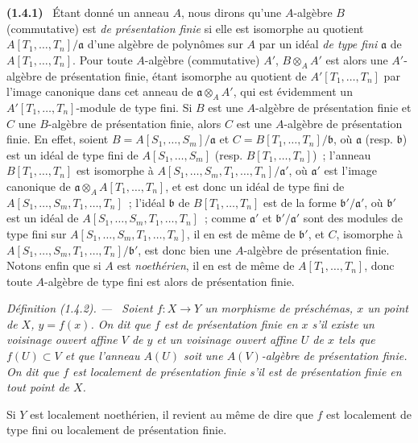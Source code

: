 \documentclass[10pt,oneside]{book}
\makeatletter
\newcommand{\setmanualcurrentlabel}[1]{\def\@currentlabel{#1}}
\newenvironment{env}[1][]{\setmanualcurrentlabel{#1}\par\medskip\noindent\textbf{(#1)}\ }{\par}
\newenvironment{definition}[1][]{%
  \setmanualcurrentlabel{#1}\par\medskip\noindent\itshape Définition (#1). ---\ }{\par}
\makeatother
\begin{document}
\begin{env}[1.4.1]
\label{IV.1.4.1-fr}
Étant donné un anneau $A$, nous dirons qu'une $A$-algèbre $B$ (commutative)
est \emph{de présentation finie} si elle est isomorphe au quotient
$A[T_1,\ldots,T_n]/\mathfrak a$ d'une algèbre de polynômes sur $A$ par un
idéal \emph{de type fini} $\mathfrak a$ de $A[T_1,\ldots,T_n]$. Pour toute
$A$-algèbre (commutative) $A'$, $B\otimes_AA'$ est alors une $A'$-algèbre de
présentation finie, étant isomorphe au quotient de $A'[T_1,\ldots,T_n]$ par
l'image canonique dans cet anneau de $\mathfrak a\otimes_AA'$, qui est
évidemment un $A'[T_1,\ldots,T_n]$-module de type fini. Si $B$ est une
$A$-algèbre de présentation finie et $C$ une $B$-algèbre de présentation
finie, alors $C$ est une $A$-algèbre de présentation finie. En effet, soient
$B=A[S_1,\ldots,S_m]/\mathfrak a$ et
$C=B[T_1,\ldots,T_n]/\mathfrak b$, où $\mathfrak a$ (resp. $\mathfrak b$) est
un idéal de type fini de $A[S_1,\ldots,S_m]$ (resp.
$B[T_1,\ldots,T_n]$)~; l'anneau $B[T_1,\ldots,T_n]$ est isomorphe à
$A[S_1,\ldots,S_m,T_1,\ldots,T_n]/\mathfrak a'$, où $\mathfrak a'$ est
l'image canonique de
$\mathfrak a\otimes_AA[T_1,\ldots,T_n]$, et est donc un idéal de type fini de
$A[S_1,\ldots,S_m,T_1,\ldots,T_n]$~; l'idéal $\mathfrak b$ de
$B[T_1,\ldots,T_n]$ est de la forme $\mathfrak b'/\mathfrak a'$, où
$\mathfrak b'$ est un idéal de $A[S_1,\ldots,S_m,T_1,\ldots,T_n]$~; comme
$\mathfrak a'$ et $\mathfrak b'/\mathfrak a'$ sont des modules de type fini
sur $A[S_1,\ldots,S_m,T_1,\ldots,T_n]$, il en est de même de $\mathfrak b'$,
et $C$, isomorphe à
$A[S_1,\ldots,S_m,T_1,\ldots,T_n]/\mathfrak b'$, est donc bien une
$A$-algèbre de présentation finie. Notons enfin que si $A$ est
\emph{noethérien}, il en est de même de $A[T_1,\ldots,T_n]$, donc toute
$A$-algèbre de type fini est alors de présentation finie.
\end{env}

\begin{definition}[1.4.2]
\label{IV.1.4.2-fr}
Soient $f:X\to Y$ un morphisme de préschémas, $x$ un point de $X$, $y=f(x)$.
On dit que $f$ est \emph{de présentation finie en $x$} s'il existe un voisinage
ouvert affine $V$ de $y$ et un voisinage ouvert affine $U$ de $x$ tels que
$f(U)\subset V$ et que l'anneau $A(U)$ soit une $A(V)$-algèbre de présentation
finie. On dit que $f$ est \emph{localement de présentation finie} s'il est de
présentation finie en tout point de $X$.
\end{definition}

Si $Y$ est localement noethérien, il revient au même de dire que $f$ est
localement de type fini ou localement de présentation finie.
\end{document}
